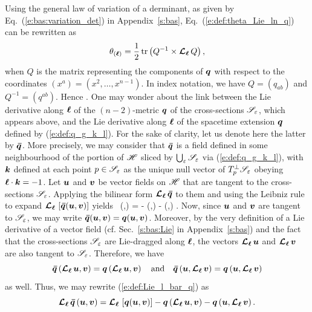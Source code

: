 Using the general law of variation of a derminant, as given by Eq.~(\ref{e:bas:variation_det})
in Appendix~\ref{s:bas}, Eq.~(\ref{e:def:theta_Lie_ln_q}) can be rewritten as
\[
    \theta_{(\bm{\ell})} = \frac{1}{2} \, \mathrm{tr} \left(Q^{-1} \times \bm{\mathcal{L}}_{\bm{\ell}}\, Q \right) ,
\]
when $Q$ is the matrix representing the components of $\bm{q}$ with respect to the
coordinates $(x^a) = (x^2,\ldots, x^{n-1})$. In index notation, we have
$Q = (q_{ab})$ and $Q^{-1} = (q^{ab})$. Hence
\be \label{e:def:theta_q_ab}
     .
\ee
One may wonder about the link between the Lie derivative along $\bm{\ell}$ of the $(n-2)$-metric
$\bm{q}$ of the cross-sections $\mathscr{S}_\varepsilon$, which appears above, and
the Lie derivative along $\bm{\ell}$ of the spacetime extension $\bm{q}$ defined by
(\ref{e:def:q_g_k_l}). For the sake of clarity, let us denote here the latter
by $\bm{\bar q}$. More precisely, we may consider that $\bm{\bar q}$ is a
field defined in some neighbourhood of the portion of $\mathscr{H}$ sliced by
$\bigcup_{\varepsilon} \mathscr{S}_\varepsilon$ via (\ref{e:def:q_g_k_l}), with $\bm{k}$
defined at each point $p\in\mathscr{S}_\varepsilon$ as the unique null vector of
$T_p^\perp\mathscr{S}_\varepsilon$ obeying $\bm{\ell}\cdot\bm{k}=-1$.
Let $\bm{u}$ and $\bm{v}$ be vector fields on $\mathscr{H}$ that are tangent
to the cross-sections $\mathscr{S}_\varepsilon$. Applying the bilinear form
$\bm{\mathcal{L}}_{\bm{\ell}}\,\bm{\bar q}$ to them and using the Leibniz rule to expand
$\bm{\mathcal{L}}_{\bm{\ell}}\, \left[ \bm{\bar q}(\bm{u},\bm{v}) \right]$ yields
\be \label{e:def:Lie_l_bar_q}
     \Lie{\el}  \, (,) = \Lie{\el} 
        - \left(\Lie{\el},\right)
         - \left(,\Lie{\el}\right) .
\ee
Now, since $\bm{u}$ and $\bm{v}$ are tangent to $\mathscr{S}_\varepsilon$, we may
write $\bm{\bar q}(\bm{u},\bm{v}) = \bm{q}(\bm{u},\bm{v})$. Moreover, by the very
definition of a Lie derivative of a vector field (cf. Sec.~\ref{s:bas:Lie}
in Appendix~\ref{s:bas}) and the fact that the cross-sections
$\mathscr{S}_\varepsilon$ are Lie-dragged along $\bm{\ell}$, the vectors
$\bm{\mathcal{L}}_{\bm{\ell}}\,\bm{u}$ and $\bm{\mathcal{L}}_{\bm{\ell}}\,\bm{v}$ are also tangent to $\mathscr{S}_\varepsilon$.
Therefore, we have
\[
    \bm{\bar q}\left(\bm{\mathcal{L}}_{\bm{\ell}}\,\bm{u},\bm{v}\right) = \bm{q} \left(\bm{\mathcal{L}}_{\bm{\ell}}\,\bm{u},\bm{v}\right)
    \quad\mbox{and}\quad
    \bm{\bar q}\left(\bm{u},\bm{\mathcal{L}}_{\bm{\ell}}\,\bm{v}\right) = \bm{q}\left(\bm{u},\bm{\mathcal{L}}_{\bm{\ell}}\,\bm{v}\right)
\]
as well. Thus, we may rewrite (\ref{e:def:Lie_l_bar_q}) as
\[
     \bm{\mathcal{L}}_{\bm{\ell}}\, \bm{\bar q} \, (\bm{u},\bm{v}) = \bm{\mathcal{L}}_{\bm{\ell}}\, \left[ \bm{q}(\bm{u},\bm{v}) \right]
        - \bm{q}\left(\bm{\mathcal{L}}_{\bm{\ell}}\,\bm{u},\bm{v}\right)
         - \bm{q}\left(\bm{u},\bm{\mathcal{L}}_{\bm{\ell}}\,\bm{v}\right) .
\]
